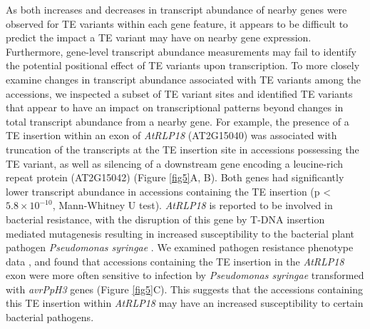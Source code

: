 \documentclass[12pt]{article}
\begin{document}
As both increases and decreases in transcript abundance of nearby
genes were observed for TE variants within each gene feature, it
appears to be difficult to predict the impact a TE variant may have on
nearby gene expression. Furthermore, gene-level transcript abundance
measurements may fail to identify the potential positional effect of
TE variants upon transcription. To more closely examine changes in
transcript abundance associated with TE variants among the accessions,
we inspected a subset of TE variant sites and identified TE variants
that appear to have an impact on transcriptional patterns beyond
changes in total transcript abundance from a nearby gene. For example,
the presence of a TE insertion within an exon of \emph{AtRLP18
}(AT2G15040) was associated with truncation of the transcripts at the
TE insertion site in accessions possessing the TE variant, as well as
silencing of a downstream gene encoding a leucine-rich repeat protein
(AT2G15042) (Figure \ref{fig5}A, B). Both genes had significantly
lower transcript abundance in accessions containing the TE insertion
(p \textless{} $5.8\times10^{-10}$, Mann-Whitney U
test). \emph{AtRLP18 }is reported to be involved in bacterial
resistance, with the disruption of this gene by T-DNA insertion
mediated mutagenesis resulting in increased susceptibility to the
bacterial plant pathogen \emph{Pseudomonas syringae}
\cite{Wang:2008km}. We examined pathogen resistance phenotype data
\cite{Aranzana:2005cq}, and found that accessions containing the TE
insertion in the \emph{AtRLP18} exon were more often sensitive to
infection by \emph{Pseudomonas syringae} transformed with
\emph{avrPpH3} genes (Figure \ref{fig5}C). This suggests that the
accessions containing this TE insertion within \emph{AtRLP18} may have
an increased susceptibility to certain bacterial pathogens.
\end{document}
